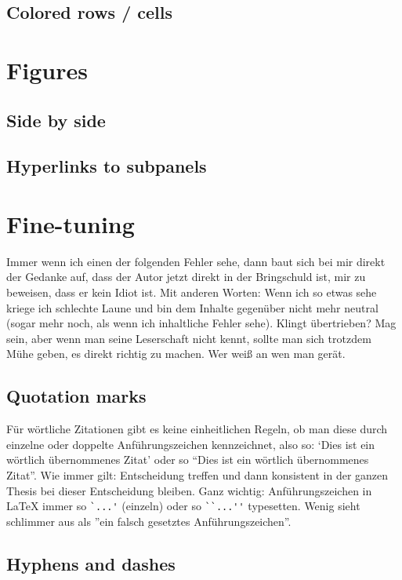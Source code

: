 \subsection{Colored rows / cells}
\section{Figures}
\subsection{Side by side}
\subsection{Hyperlinks to subpanels}
\section{Fine-tuning}
Immer wenn ich einen der folgenden Fehler sehe, dann baut sich bei mir direkt der Gedanke auf, dass der Autor jetzt direkt in der Bringschuld ist, mir zu beweisen, dass er kein Idiot ist. Mit anderen Worten: Wenn ich so etwas sehe kriege ich schlechte Laune und bin dem Inhalte gegenüber nicht mehr neutral (sogar mehr noch, als wenn ich inhaltliche Fehler sehe). Klingt übertrieben? Mag sein, aber wenn man seine Leserschaft nicht kennt, sollte man sich trotzdem Mühe geben, es direkt richtig zu machen. Wer weiß an wen man gerät.
\subsection{Quotation marks}
Für wörtliche Zitationen gibt es keine einheitlichen Regeln, ob man diese durch einzelne oder doppelte Anführungszeichen kennzeichnet, also so: `Dies ist ein wörtlich übernommenes Zitat' oder so ``Dies ist ein wörtlich übernommenes Zitat''. Wie immer gilt: Entscheidung treffen und dann konsistent in der ganzen Thesis bei dieser Entscheidung bleiben. Ganz wichtig: Anführungszeichen in LaTeX immer so \verb|`...'| (einzeln) oder so \verb|``...''| typesetten. Wenig sieht schlimmer aus als ''ein falsch gesetztes Anführungszeichen''.

\subsection{Hyphens and dashes}

